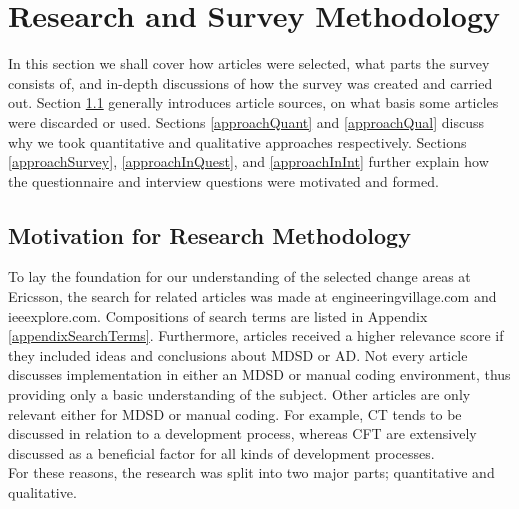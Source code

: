 \documentclass[final_report_innit.tex]{subfiles}
\begin{document}
\section{Research and Survey Methodology}\label{approach}
In this section we shall cover how articles were selected, what parts the survey consists of, and in-depth discussions of how the survey was created and carried out. Section \ref{approachChoice} generally introduces article sources, on what basis some articles were discarded or used. Sections \ref{approachQuant} and \ref{approachQual} discuss why we took quantitative and qualitative approaches respectively. Sections \ref{approachSurvey}, \ref{approachInQuest}, and \ref{approachInInt} further explain how the questionnaire and interview questions were motivated and formed.

\subsection{Motivation for Research Methodology}\label{approachChoice}
To lay the foundation for our understanding of the selected change areas at Ericsson, the search for related articles was made at engineeringvillage.com and ieeexplore.com. Compositions of search terms are listed in Appendix \ref{appendixSearchTerms}. Furthermore, articles received a higher relevance score if they included ideas and conclusions about MDSD or AD. Not every article discusses implementation in either an MDSD or manual coding environment, thus providing only a basic understanding of the subject. Other articles are only relevant either for MDSD or manual coding. For example, CT tends to be discussed in relation to a development process, whereas CFT are extensively discussed as a beneficial factor for all kinds of development processes.
\\

For these reasons, the research was split into two major parts; quantitative and qualitative.
\\
\end{document}
